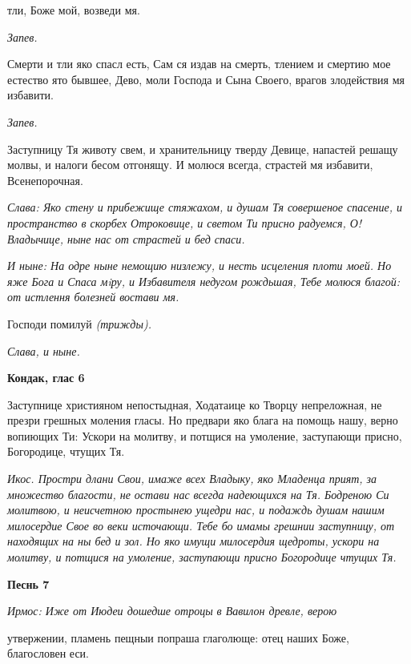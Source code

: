 тли, Боже мой, возведи мя.


 \itshape Запев.\normalfont{}


   Смерти и тли яко спасл есть, Сам ся издав на смерть, тлением и смертию
мое естество ято бывшее, Дево, моли Господа и Сына Своего, врагов
злодействия мя избавити.


 \itshape Запев.\normalfont{}


   Заступницу Тя животу свем, и хранительницу тверду Девице, напастей
решащу молвы, и налоги бесом отгонящу. И молюся всегда, страстей мя
избавити, Всенепорочная.


 \itshape Слава:\normalfont{} Яко стену и прибежище стяжахом, и душам Тя совершеное
спасение, и пространство в скорбех Отроковице, и светом Ти присно
радуемся, О! Владычице, ныне нас от страстей и бед спаси.


 \itshape И ныне:\normalfont{} На одре ныне немощию низлежу, и несть исцеления плоти моей.
Но яже Бога и Спаса мiру, и Избавителя недугом рождьшая, Тебе молюся
благой: от истлення болезней востави мя.


   Господи помилуй \itshape (трижды)\normalfont{}.


 \itshape Слава, и ныне\normalfont{}.






 

\bfseries Кондак, глас 6\normalfont{}


   Заступнице християном непостыдная, Ходатаице ко Творцу непреложная,
не презри грешных моления гласы. Но предвари яко блага на помощь нашу,
верно вопиющих Ти: Ускори на молитву, и потщися на умоление,
заступающи присно, Богородице, чтущих Тя.


 \itshape Икос.\normalfont{} Простри длани Свои, имаже всех Владыку, яко Младенца прият, за
множество благости, не остави нас всегда надеющихся на Тя. Бодреною Си
молитвою, и неисчетною простынею ущедри нас, и подаждь душам нашим
милосердие Свое во веки источающи. Тебе бо имамы грешнии заступницу, от
находящих на ны бед и зол. Но яко имущи милосердия щедроты, ускори на
молитву, и потщися на умоление, заступающи присно Богородице чтущих
Тя.






 

\bfseries Песнь 7\normalfont{}


 \itshape Ирмос:\normalfont{} Иже от Июдеи дошедше отроцы в Вавилон древле, верою

утвержении, пламень пещныи попраша глаголюще: отец наших Боже,
благословен еси.


